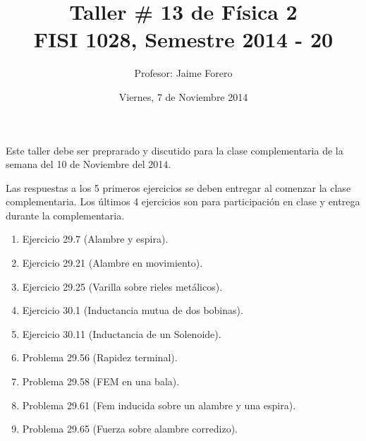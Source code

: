 \documentclass{article}
\title{Taller \# 13 de F\'isica 2\\ FISI 1028, Semestre 2014 - 20}
\author{Profesor: Jaime Forero}
\date{Viernes, 7 de Noviembre 2014}
\begin{document}
\maketitle
\thispagestyle{empty}

\noindent



Este taller debe ser preprarado y discutido para la clase
complementaria de la semana del 10 de Noviembre del 2014.


Las respuestas a los 5 primeros ejercicios se deben entregar al comenzar la
clase complementaria. Los \'ultimos 4 ejercicios son para
participaci\'on en clase y entrega durante la complementaria. 


\begin{enumerate}

\item
Ejercicio 29.7 (Alambre y espira).

\item
Ejercicio 29.21 (Alambre en movimiento).

\item
Ejercicio 29.25 (Varilla sobre rieles met\'alicos).

\item
Ejercicio 30.1 (Inductancia mutua de dos bobinas).

\item
Ejercicio 30.11 (Inductancia de un Solenoide).

\item
Problema 29.56 (Rapidez terminal).

\item
Problema 29.58 (FEM en una bala).

\item
Problema 29.61 (Fem inducida sobre un alambre y una espira).

\item
Problema 29.65 (Fuerza sobre alambre corredizo).


\end{enumerate}
\end{document}
